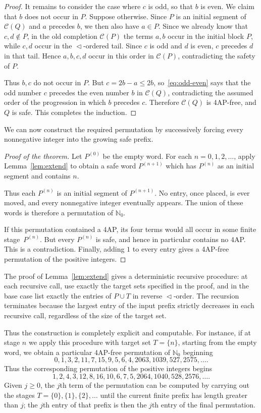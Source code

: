 \documentclass[12pt,reqno]{amsart}
\newcommand{\NN}{\mathbb N}
\newcommand{\bits}{\mathrel{\triangleleft}}
\newcommand{\C}[1]{\mathcal C(#1)}
\begin{document}
\begin{proof}
It remains to consider the case where $c$ is odd, so that $b$ is even. We claim
that $b$ does not occur in $P$. Suppose otherwise. Since $P$ is an initial
segment of $\C Q$ and $a$ precedes $b$, we then also have $a\in P$. Since we
already know that $c,d\notin P$, in the old completion $\C P$ the terms $a,b$
occur in the initial block $P$, while $c,d$ occur in the $\bits$-ordered tail.
Since $c$ is odd and $d$ is even, $c$ precedes $d$ in that tail. Hence $a,b,c,d$
occur in this order in $\C P$, contradicting the safety of $P$.

Thus $b,c$ do not occur in $P$. But $c=2b-a\le2b$, so~\eqref{eq:odd-even} says
that the odd number $c$ precedes the even number $b$ in $\C Q$, contradicting
the assumed order of the progression in which $b$ precedes $c$.
Therefore $\C Q$ is 4AP-free, and $Q$ is safe. This completes the induction.
\end{proof}

We can now construct the required permutation by successively forcing every
nonnegative integer into the growing safe prefix.

\begin{proof}[Proof of the theorem]
Let $P^{(0)}$ be the empty word. For each $n=0,1,2,\ldots$, apply
Lemma~\ref{lem:extend} to obtain a safe word $P^{(n+1)}$ which has $P^{(n)}$ as
an initial segment and contains $n$.

Thus each $P^{(n)}$ is an initial segment of $P^{(n+1)}$. No entry, once placed,
is ever moved, and every nonnegative integer eventually appears. The union of
these words is therefore a permutation of $\NN_0$.

If this permutation contained a 4AP, its four terms would all occur in some
finite stage~$P^{(n)}$. But every $P^{(n)}$ is safe, and hence in particular
contains no 4AP. This is a contradiction. Finally, adding $1$ to every entry
gives a 4AP-free permutation of the positive integers.
\end{proof}

\medskip
\noindent
The proof of Lemma~\ref{lem:extend} gives a deterministic recursive procedure:
at each recursive call, use exactly the target sets specified in the proof, and
in the base case list exactly the entries of $P\cup T$ in reverse $\bits$-order.
The recursion terminates because the largest entry of the input prefix strictly
decreases in each recursive call, regardless of the size of the target set.

Thus the construction is completely explicit and computable. For instance, if at
stage $n$ we apply this procedure with target set $T=\{n\}$, starting from the
empty word, we obtain a particular 4AP-free permutation of $\NN_0$ beginning
$$
0,1,3,2,11,7,15,9,5,6,4,2063,1039,527,2575,\ldots.
$$
Thus the corresponding permutation of the positive integers begins
$$
1,2,4,3,12,8,16,10,6,7,5,2064,1040,528,2576,\ldots.
$$
Given $j\ge0$, the $j$th term of the permutation can be computed by carrying out
the stages $T=\{0\},\{1\},\{2\},\ldots$ until the current finite prefix has
length greater than $j$; the $j$th entry of that prefix is then the $j$th entry
of the final permutation.
\end{document}
